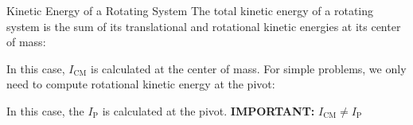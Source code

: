 \documentclass[12pt,compress,aspectratio=169]{beamer}
\begin{document}
\begin{frame}{Kinetic Energy of a Rotating System}
  The total kinetic energy of a rotating system is the sum of its translational
  and rotational kinetic energies at its center of mass:

  
  In this case, $I_\text{CM}$ is calculated at the center of
  mass. For simple problems, we only need to compute rotational kinetic energy
  at the pivot:

  
  In this case, the $I_\text{P}$ is calculated at the pivot.
  \textbf{IMPORTANT:} $I_\text{CM}\neq I_\text{P}$
\end{frame}



\end{document}

